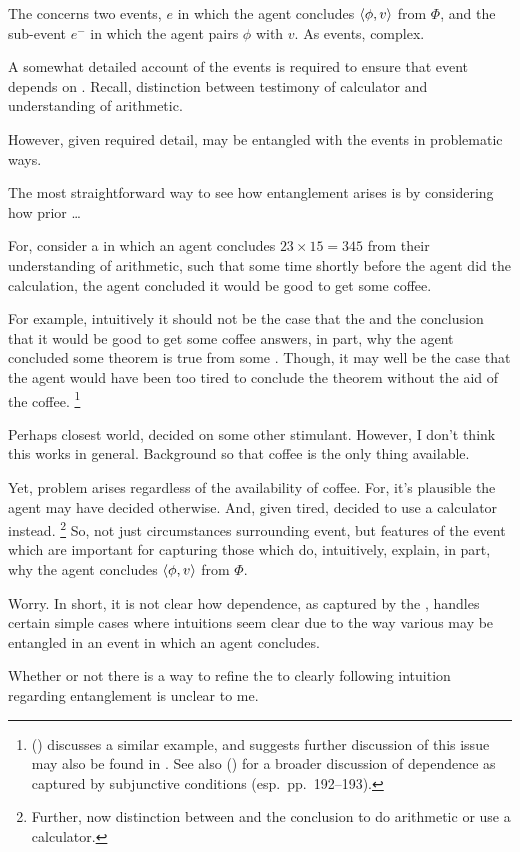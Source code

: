 \begin{note}
  The \itc{} concerns two events, \(e\) in which the agent concludes \(\langle \phi, v \rangle\) from \(\Phi\), and the sub-event \(e^{-}\) in which the agent pairs \(\phi\) with \(v\).
  As events, complex.

  A somewhat detailed account of the events is required to ensure that event depends on \ros{}.
  Recall, distinction between testimony of calculator and understanding of arithmetic.

  However, given required detail,  may be entangled with the events in problematic ways.

  The most straightforward way to see how entanglement arises is by considering how prior  \dots

  For, consider a  in which an agent concludes \(23 \times 15 = 345\) from their understanding of arithmetic, such that some time shortly before the agent did the calculation, the agent concluded it would be good to get some coffee.

  For example, intuitively it should not be the case that the \ros{} and the conclusion that it would be good to get some coffee answers, in part, why the agent concluded some theorem is true from some \poP{}.
  Though, it may well be the case that the agent would have been too tired to conclude the theorem without the aid of the coffee.%
  \footnote{
    \citeauthor{Armstrong:1968vh} (\citeyear[195--196]{Armstrong:1968vh}) discusses a similar example, and suggests further discussion of this issue may also be found in \textcite{Moore:1962up}.
    See also \citeauthor{Sanford:1989aa} (\citeyear{Sanford:1989aa}) for a broader discussion of dependence as captured by subjunctive conditions (esp.\ pp.\ 192--193).
  }

  Perhaps closest world, decided on some other stimulant.
  However, I don't think this works in general.
  Background so that coffee is the only thing available.

  Yet, problem arises regardless of the availability of coffee.
  For, it's plausible the agent may have decided otherwise.
  And, given tired, decided to use a calculator instead.%
  \footnote{
    Further, now distinction  between  and the conclusion to do arithmetic or use a calculator.
  }
  So, not just circumstances surrounding event, but features of the event which are important for capturing those  which do, intuitively, explain, in part, why the agent concludes \(\langle \phi, v \rangle\) from \(\Phi\).

  Worry.
  In short, it is not clear how dependence, as captured by the \itc{}, handles certain simple cases where intuitions seem clear due to the way various  may be entangled in an event in which an agent concludes.

  Whether or not there is a way to refine the \itc{} to clearly following intuition regarding entanglement is unclear to me.
\end{note}

